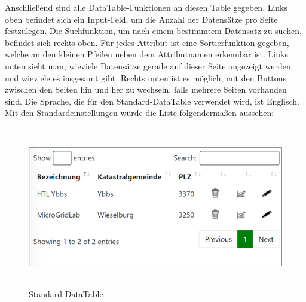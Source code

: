Anschließend sind alle DataTable-Funktionen an diesen Table gegeben.
Links oben befindet sich ein Input-Feld, um die Anzahl der Datensätze pro Seite festzulegen. Die Suchfunktion, um nach einem bestimmtem Datensatz zu suchen, befindet sich rechts oben.
Für jedes Attribut ist eine Sortierfunktion gegeben, welche an den kleinen Pfeilen neben dem Attributnamen erkennbar ist. Links unten sieht man, wieviele Datensätze gerade auf dieser Seite angezeigt werden und wieviele es insgesamt gibt. Rechts unten ist es möglich, mit den Buttons zwischen den Seiten hin und her zu wechseln, falls mehrere Seiten vorhanden sind.
Die Sprache, die für den Standard-DataTable verwendet wird, ist Englisch.
Mit den Standardeinstellungen würde die Liste folgendermaßen aussehen:
\newline
\begin{figure}[h]
	\centering
	\includegraphics[height=7cm,width=14cm]{images/DataTableStandard}
	\caption{Standard DataTable}
	\label{fig:Energiesystem auswählen }
\end{figure}



